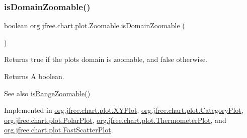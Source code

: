 \mbox{\label{interfaceorg_1_1jfree_1_1chart_1_1plot_1_1_zoomable_a7c10a2f8573d8238ce31a4ee8d7dd2db}} 
\subsubsection{\texorpdfstring{is\+Domain\+Zoomable()}{isDomainZoomable()}}
{\footnotesize\ttfamily boolean org.\+jfree.\+chart.\+plot.\+Zoomable.\+is\+Domain\+Zoomable (\begin{DoxyParamCaption}{ }\end{DoxyParamCaption})}

Returns {\ttfamily true} if the plot\textquotesingle{}s domain is zoomable, and {\ttfamily false} otherwise.

\begin{DoxyReturn}{Returns}
A boolean.
\end{DoxyReturn}
\begin{DoxySeeAlso}{See also}
\mbox{\hyperlink{interfaceorg_1_1jfree_1_1chart_1_1plot_1_1_zoomable_aee592b4d6f620a0571974e29247a66b1}{is\+Range\+Zoomable()}} 
\end{DoxySeeAlso}


Implemented in \mbox{\hyperlink{classorg_1_1jfree_1_1chart_1_1plot_1_1_x_y_plot_a5f49e32b31451203cae07ffee7cab4db}{org.\+jfree.\+chart.\+plot.\+X\+Y\+Plot}}, \mbox{\hyperlink{classorg_1_1jfree_1_1chart_1_1plot_1_1_category_plot_a6a2b57b6fac55866636c24ea8fa92469}{org.\+jfree.\+chart.\+plot.\+Category\+Plot}}, \mbox{\hyperlink{classorg_1_1jfree_1_1chart_1_1plot_1_1_polar_plot_ad077d0e320047532577c86cc50f1ddec}{org.\+jfree.\+chart.\+plot.\+Polar\+Plot}}, \mbox{\hyperlink{classorg_1_1jfree_1_1chart_1_1plot_1_1_thermometer_plot_a6685f62ba19ca11218dc82abb997be1e}{org.\+jfree.\+chart.\+plot.\+Thermometer\+Plot}}, and \mbox{\hyperlink{classorg_1_1jfree_1_1chart_1_1plot_1_1_fast_scatter_plot_ad76e90758ec2f53171f72cba288621a4}{org.\+jfree.\+chart.\+plot.\+Fast\+Scatter\+Plot}}.

\mbox{\label{interfaceorg_1_1jfree_1_1chart_1_1plot_1_1_zoomable_aee592b4d6f620a0571974e29247a66b1}} 
